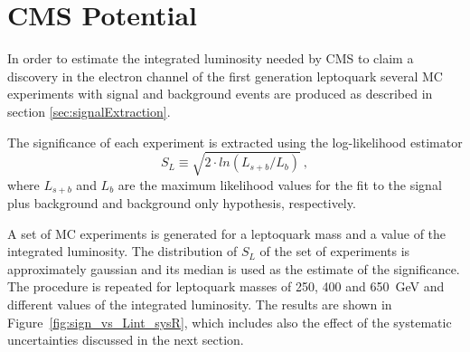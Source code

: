 %

\section{CMS Potential} \label{CMSpotential}





In order to estimate the integrated luminosity needed by CMS to claim 
a discovery in the electron channel of the first generation leptoquark
several MC experiments with signal and background events are produced
as described in section \ref{sec:signalExtraction}.

The significance of each experiment is extracted using the log-likelihood estimator 
\begin{displaymath}
S_L \equiv \sqrt{2\cdot ln{(L_{s+b}/L_{b})}}~\mathrm{,}
\end{displaymath}
where $L_{s+b}$ and $L_b$ are the maximum likelihood values for the fit to
the signal plus background and background only hypothesis, respectively.

A set of MC experiments is generated for a leptoquark mass and a value of 
the integrated luminosity.
The distribution of $S_L$ of the set of experiments is approximately gaussian 
and its median is used as the estimate of the significance.
The procedure is repeated for leptoquark masses of 250, 400 and 650~GeV and
different values of the integrated luminosity. The results are shown in
Figure~\ref{fig:sign_vs_Lint_sysR}, which includes also the effect of the systematic 
uncertainties discussed in the next section. 



